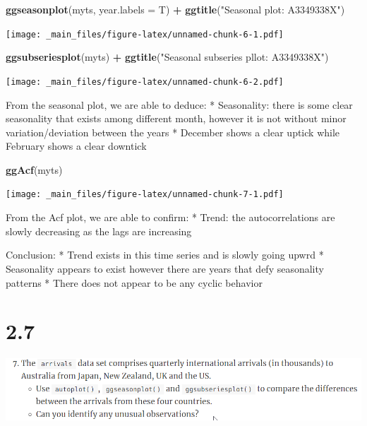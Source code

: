 \documentclass[]{book}
\newenvironment{Shaded}{\begin{snugshade}}{\end{snugshade}}
\newcommand{\DataTypeTok}[1]{\textcolor[rgb]{0.13,0.29,0.53}{#1}}
\newcommand{\KeywordTok}[1]{\textcolor[rgb]{0.13,0.29,0.53}{\textbf{#1}}}
\newcommand{\NormalTok}[1]{#1}
\newcommand{\OperatorTok}[1]{\textcolor[rgb]{0.81,0.36,0.00}{\textbf{#1}}}
\newcommand{\StringTok}[1]{\textcolor[rgb]{0.31,0.60,0.02}{#1}}
\begin{document}
\begin{Shaded}
\begin{Highlighting}[]
\KeywordTok{ggseasonplot}\NormalTok{(myts, }\DataTypeTok{year.labels =}\NormalTok{ T) }\OperatorTok{+}
\StringTok{  }\KeywordTok{ggtitle}\NormalTok{(}\StringTok{"Seasonal plot: A3349338X"}\NormalTok{)}
\end{Highlighting}
\end{Shaded}

\texttt{[image: \_main\_files/figure-latex/unnamed-chunk-6-1.pdf]}

\begin{Shaded}
\begin{Highlighting}[]
\KeywordTok{ggsubseriesplot}\NormalTok{(myts) }\OperatorTok{+}
\StringTok{  }\KeywordTok{ggtitle}\NormalTok{(}\StringTok{"Seasonal subseries pllot: A3349338X"}\NormalTok{)}
\end{Highlighting}
\end{Shaded}

\texttt{[image: \_main\_files/figure-latex/unnamed-chunk-6-2.pdf]}

From the seasonal plot, we are able to deduce:
* Seasonality: there is some clear seasonality that exists among different month, however it is not without minor variation/deviation between the years
* December shows a clear uptick while February shows a clear downtick

\begin{Shaded}
\begin{Highlighting}[]
\KeywordTok{ggAcf}\NormalTok{(myts)}
\end{Highlighting}
\end{Shaded}

\texttt{[image: \_main\_files/figure-latex/unnamed-chunk-7-1.pdf]}

From the Acf plot, we are able to confirm:
* Trend: the autocorrelations are slowly decreasing as the lags are increasing

Conclusion:
* Trend exists in this time series and is slowly going upwrd
* Seasonality appears to exist however there are years that defy seasonality patterns
* There does not appear to be any cyclic behavior

\hypertarget{section-1}{%
\section{2.7}\label{section-1}}

\includegraphics{./week1/2.7.png}
\end{document}
